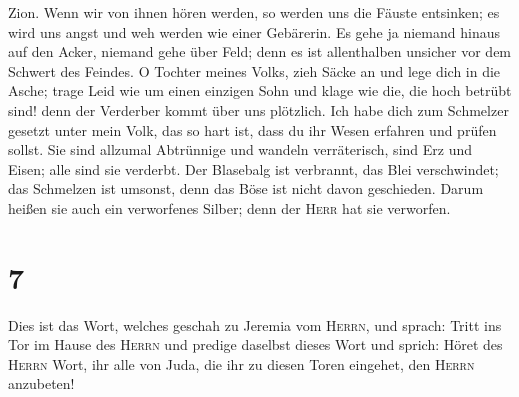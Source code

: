 Zion.  Wenn wir von ihnen hören werden, so werden uns die
Fäuste entsinken; es wird uns angst und weh werden wie einer Gebärerin.
 Es gehe ja niemand hinaus auf den Acker, niemand gehe
über Feld; denn es ist allenthalben unsicher vor dem Schwert des
Feindes.  O Tochter meines Volks, zieh Säcke an und lege
dich in die Asche; trage Leid wie um einen einzigen Sohn und klage wie
die, die hoch betrübt sind! denn der Verderber kommt über uns plötzlich.
 Ich habe dich zum Schmelzer gesetzt unter mein Volk, das
so hart ist, dass du ihr Wesen erfahren und prüfen sollst.
 Sie sind allzumal Abtrünnige und wandeln verräterisch,
sind Erz und Eisen; alle sind sie verderbt.  Der
Blasebalg ist verbrannt, das Blei verschwindet; das Schmelzen ist
umsonst, denn das Böse ist nicht davon geschieden.  Darum
heißen sie auch ein verworfenes Silber; denn der \textsc{Herr} hat sie
verworfen.

\hypertarget{section-6}{%
\section{7}\label{section-6}}

 Dies ist das Wort, welches geschah zu Jeremia vom
\textsc{Herrn}, und sprach:  Tritt ins Tor im Hause des
\textsc{Herrn} und predige daselbst dieses Wort und sprich: Höret des
\textsc{Herrn} Wort, ihr alle von Juda, die ihr zu diesen Toren
eingehet, den \textsc{Herrn} anzubeten!

